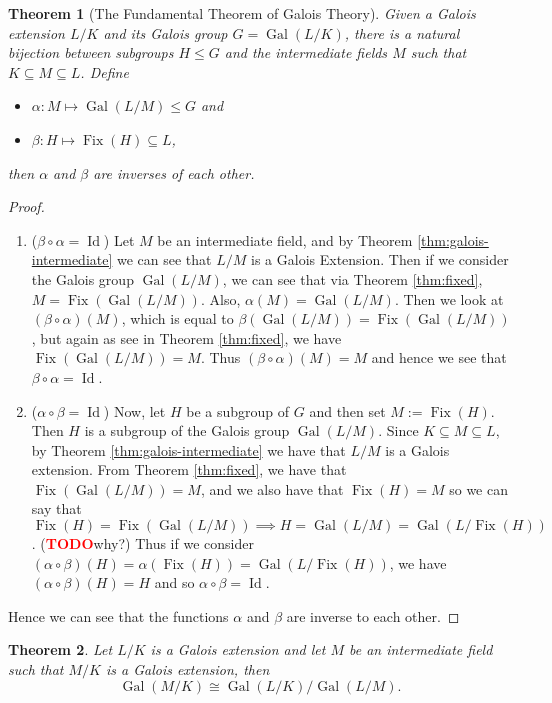 \documentclass[12pt]{article}
\newtheorem{theorem}{Theorem}
\theoremstyle{definition}
\newcommand{\Gal}{\operatorname{Gal}}
\newcommand{\Fix}{\operatorname{Fix}}
\newcommand{\Id}{\operatorname{Id}}
\newcommand{\TODO}{\textbf{\textcolor{red}{TODO}}}
\begin{document}
\begin{theorem}[The Fundamental Theorem of Galois Theory] \label{thm:fundamental-theorem} Given a Galois extension $L/K$ and its Galois group $G = \Gal(L/K)$, there is a natural bijection between subgroups $H\leq G$ and the intermediate fields $M$ such that $K \subseteq M \subseteq L$. Define

\begin{itemize}
    \item $\alpha:M \mapsto \Gal(L/M) \leq G$ and
    \item $\beta:H \mapsto \Fix(H) \subseteq L$,
\end{itemize}
then $\alpha$ and $\beta$ are inverses of each other.
\end{theorem}
\begin{proof}
\begin{enumerate}[label=(\roman*)]

 \item ($\beta \circ \alpha = \Id$) Let $M$ be an intermediate field, and by Theorem \ref{thm:galois-intermediate} we can see that $L/M$ is a Galois Extension. Then if we consider the Galois group $\Gal(L/M)$, we can see that via Theorem \ref{thm:fixed}, $M = \Fix(\Gal(L/M))$. Also, $\alpha(M) = \Gal(L/M)$. Then we look at $(\beta \circ \alpha)(M)$, which is equal to $\beta(\Gal(L/M)) = \Fix(\Gal(L/M))$, but again as see in Theorem \ref{thm:fixed}, we have $\Fix(\Gal(L/M)) = M$. Thus $(\beta \circ \alpha)(M) = M$ and hence we see that $\beta \circ \alpha = \Id$.

 \item ($\alpha \circ \beta = \Id$) Now, let $H$ be a subgroup of $G$ and then set $M :=\Fix(H)$. Then $H$ is a subgroup of the Galois group $\Gal(L/M)$. Since $K \subseteq M \subseteq L$, by Theorem \ref{thm:galois-intermediate} we have that $L/M$ is a Galois extension. From Theorem \ref{thm:fixed}, we have that $\Fix(\Gal(L/M))=M$, and we also have that $\Fix(H) = M$ so we can say that $\Fix(H)=\Fix(\Gal(L/M)) \implies H = \Gal(L/M) = \Gal(L/\Fix(H))$. (\TODO why?) Thus if we consider $(\alpha \circ \beta)(H) = \alpha(\Fix(H)) = \Gal(L/\Fix(H))$, we have $(\alpha \circ \beta)(H) = H$ and so $\alpha \circ \beta = \Id$.
\end{enumerate}
Hence we can see that the functions $\alpha$ and $\beta$ are inverse to each other.
\end{proof}



\begin{theorem} \label{thm:correspondence-quotient}
    Let $L / K$ is a Galois extension and let $M$ be an intermediate field such that $M /K$ is a Galois extension, then 
    $$\Gal(M / K) \cong \Gal(L / K) / \Gal(L / M). $$
\end{theorem}
\end{document}
